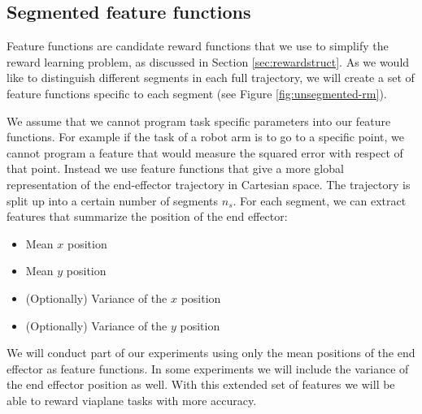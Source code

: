 \documentclass[mscThesis.tex]{subfiles}
\begin{document}
\subsection{Segmented feature functions}
Feature functions are candidate reward functions that we use to simplify the reward learning problem, as discussed in Section \ref{sec:rewardstruct}. As we would like to distinguish different segments in each full trajectory, we will create a set of feature functions specific to each segment (see Figure \ref{fig:unsegmented-rm}). 

We assume that we cannot program task specific parameters into our feature functions. For example if the task of a robot arm is to go to a specific point, we cannot program a feature that would measure the squared error with respect of that point. Instead we use feature functions that give a more global representation of the end-effector trajectory in Cartesian space. The trajectory is split up into a certain number of segments $n_s$. For each segment, we can extract features that summarize the position of the end effector:

\begin{itemize}
\item Mean $x$ position
\item Mean $y$ position
\item (Optionally) Variance of the $x$ position
\item (Optionally) Variance of the $y$ position
\end{itemize}

We will conduct part of our experiments using only the mean positions of the end effector as feature functions. In some experiments we will include the variance of the end effector position as well. With this extended set of features we will be able to reward viaplane tasks with more accuracy. 
\end{document}
